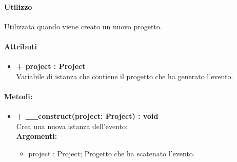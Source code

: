 \paragraph{Utilizzo}
Utilizzata quando viene creato un nuovo progetto.

\paragraph{Attributi}
\begin{itemize}
	\item \textbf{+ project : Project}\\
	Variabile di istanza che contiene il progetto che ha generato l'evento.   
\end{itemize}

\paragraph{Metodi:}
\begin{itemize}
	\item \textbf{+ \_\_construct(project: Project) : void}\\
	Crea una nuova istanza dell'evento:\\
	\textbf{Argomenti:}
	\begin{itemize}
		\item project : Project;
		Progetto che ha scatenato l'evento.
	\end{itemize}
\end{itemize}
